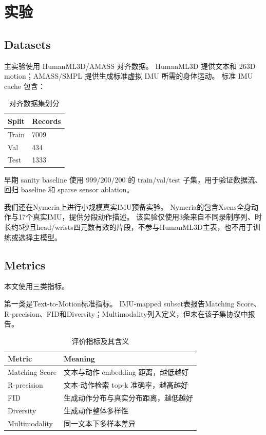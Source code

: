 \section{实验}
\label{sec:4_experiments}


\subsection{Datasets}

主实验使用 HumanML3D/AMASS 对齐数据。
HumanML3D 提供文本和 263D motion；AMASS/SMPL 提供生成标准虚拟 IMU 所需的身体运动。
标准 IMU cache 包含：

\begin{table}[t]
\centering
\caption{对齐数据集划分}
\label{tab:result-4}
\footnotesize
\setlength{\tabcolsep}{3pt}
\renewcommand{\arraystretch}{1.15}
\begin{tabularx}{\linewidth}{LL}
\toprule
Split & Records \\
\midrule
Train & 7009 \\
Val & 434 \\
Test & 1333 \\
\bottomrule
\end{tabularx}
\end{table}


早期 sanity baseline 使用 999/200/200 的 train/val/test 子集，用于验证数据流、回归 baseline 和 sparse sensor ablation。

我们还在Nymeria上进行小规模真实IMU预备实验。
Nymeria的\texttt{}包含Xsens全身动作与17个真实IMU，\texttt{}提供分段动作描述。
该实验仅使用3条来自不同录制序列、时长约5秒且head/wrists四元数有效的片段，不参与HumanML3D主表，也不用于训练或选择主模型。

\subsection{Metrics}

本文使用三类指标。

第一类是Text-to-Motion标准指标。
IMU-mapped subset表报告Matching Score、R-precision、FID和Diversity；Multimodality列入定义，但未在该子集协议中报告。

\begin{table}[t]
\centering
\caption{评价指标及其含义}
\label{tab:result-5}
\footnotesize
\setlength{\tabcolsep}{3pt}
\renewcommand{\arraystretch}{1.15}
\begin{tabularx}{\linewidth}{LL}
\toprule
Metric & Meaning \\
\midrule
Matching Score & 文本与动作 embedding 距离，越低越好 \\
R-precision & 文本-动作检索 top-k 准确率，越高越好 \\
FID & 生成动作分布与真实分布距离，越低越好 \\
Diversity & 生成动作整体多样性 \\
Multimodality & 同一文本下多样本差异 \\
\bottomrule
\end{tabularx}
\end{table}


